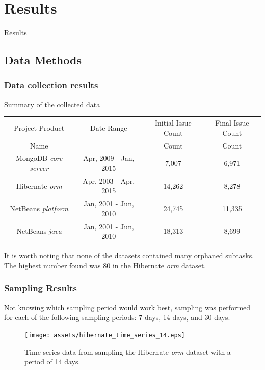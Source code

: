 \documentclass[presentation]{beamer}
\begin{document}
\section{Results}

\begin{frame}
\begin{center}
\Large{Results}
\end{center}
\end{frame}

\subsection{Data Methods}

\begin{frame}[t]
\frametitle{Data collection results}
Summary of the collected data
\begin{table}
\centering
\scriptsize  
\begin{tabular}{c | c | c | c}
Project Product & Date Range & Initial Issue Count & Final Issue Count \\
Name &  & Count & Count \\
\hline
MongoDB \textit{core server} & Apr, 2009 - Jan, 2015 & 7,007 & 6,971 \\
Hibernate \textit{orm} & Apr, 2003 - Apr, 2015 & 14,262 & 8,278 \\
NetBeans \textit{platform} & Jan, 2001 - Jun, 2010 & 24,745 & 11,335 \\
NetBeans \textit{java} & Jan, 2001 - Jun, 2010 & 18,313 & 8,699 \\
\hline
\end{tabular}
\end{table}
It is worth noting that none of the datasets contained many orphaned subtasks.
The highest number found was 80 in the Hibernate \textit{orm} dataset.
\end{frame}

\begin{frame}[t]
\frametitle{Sampling Results}
Not knowing which sampling period would work best, sampling was performed for each of the
following sampling periods: 7 days, 14 days, and 30 days.

\begin{figure}[htbp]
\begin{center}
\texttt{[image: assets/hibernate\_time\_series\_14.eps]}
\caption{Time series data from sampling the Hibernate \textit{orm} dataset with a period of 14 days.}
\end{center}
\end{figure}

\end{frame}
\end{document}
